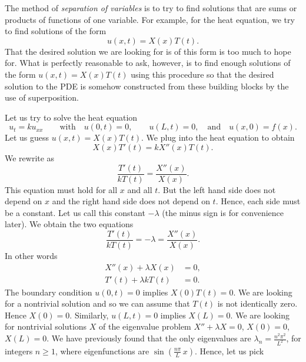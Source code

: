 \documentclass[12pt]{book}
\begin{document}
The method of
\emph{separation of variables} is to
try to find solutions that are sums or products of functions of one variable.
For example, for the heat equation, we try to find solutions of the form
\begin{equation*}
u(x,t) = X(x)T(t) .
\end{equation*}
That the desired solution we are looking for is of this form is too much to
hope for.  What is perfectly reasonable to ask, however, is to find
enough  solutions of the form
$u(x,t) = X(x)T(t)$ using this procedure
so that the desired solution to the PDE is somehow constructed from these
building blocks by the use of superposition.

Let us try to solve the heat equation
\begin{equation*}
u_t = k u_{xx}
\qquad \text{with} \quad
u(0,t) = 0 ,\quad \quad u(L,t) = 0,
\quad \text{and} \quad u(x,0) = f(x) .
\end{equation*}
Let us guess $u(x,t) = X(x)T(t)$.  We plug into the heat equation to
obtain
\begin{equation*}
X(x)T'(t) = k X''(x)T(t) .
\end{equation*}
We rewrite as
\begin{equation*}
\frac{T'(t)}{k T(t)} =
\frac{X''(x)}{X(x)} .
\end{equation*}
This equation must hold for all $x$ and all $t$.  But the left
hand side does not depend on $x$ and the right hand side does not
depend on $t$.  Hence, each side must be a constant.  Let us call this
constant $-\lambda$ (the minus sign is for convenience later).
We obtain the two equations
\begin{equation*}
\frac{T'(t)}{k T(t)} = -\lambda =
\frac{X''(x)}{X(x)} .
\end{equation*}
In other words
\begin{align*}
X''(x) + \lambda X(x) &= 0 , \\
T'(t) + \lambda k T(t) &= 0 .
\end{align*}
The boundary condition $u(0,t) = 0$ implies $X(0)T(t) = 0$.  We are looking
for a nontrivial solution and so we can assume that $T(t)$ is not identically
zero.  Hence $X(0) = 0$.  Similarly, $u(L,t) = 0$ implies $X(L) = 0$.  We
are looking for nontrivial solutions $X$ of the eigenvalue problem
$X'' + \lambda X = 0$, $X(0) = 0$, $X(L) = 0$.  We have previously found that
the only eigenvalues are $\lambda_n = \frac{n^2 \pi^2}{L^2}$, for integers
$n \geq 1$,
where eigenfunctions are $\sin \left(\frac{n \pi}{L} \, x\right)$.  Hence, let us pick
\end{document}
